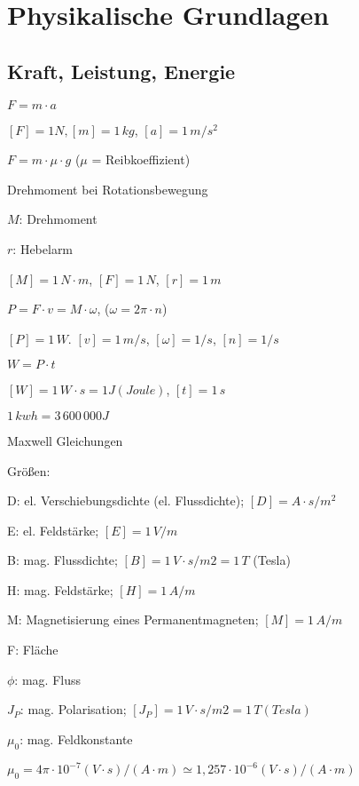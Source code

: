\documentclass[german]{latex4ei/latex4ei_sheet}
\begin{document}
	\section{Physikalische Grundlagen}
	\begin{sectionbox}
		\subsection{Kraft, Leistung, Energie}
			$F= m \cdot a$

			$[F] = 1N,[m]= 1\,kg$, $[a]= 1\,m/s^2$

			$F= m \cdot \mu \cdot g$ ($\mu$ = Reibkoeffizient)

			\begin{symbolbox}{Drehmoment bei Rotationsbewegung}
				\item $M$: Drehmoment
				\item $r$: Hebelarm
				\item $[M] = 1\,N \cdot m$, $[F]= 1\,N$, $[r]=1\,m$
				\item $P = F\cdot v = M\cdot \omega$, ($\omega = 2\pi\cdot n$)
				\item $[P]= 1\,W$. $[v]= 1\,m/s$, $[\omega]=1/s$, $[n]=1/s$ 
				\item $W= P\cdot t$
				\item $[W]= 1\,W\cdot s = 1J(Joule)$, $[t] = 1\,s$
				\item $1\,kwh = 3\,600\,000 J$
			\end{symbolbox}
			\begin{bluebox}{Maxwell Gleichungen}
				\item Größen:
				\item D: el. Verschiebungsdichte (el. Flussdichte); $[D] = A \cdot s/m^2$
				\item E: el. Feldstärke; $[E ] = 1\,V/m$
				\item B: mag. Flussdichte; $[B] = 1\,V\cdot s/m2 = 1\,T$ (Tesla)
				\item H: mag. Feldstärke; $[H] = 1\,A/m$
				\item M: Magnetisierung eines Permanentmagneten; $[M] = 1\,A/m$
				\item F: Fläche
				\item $\phi$: mag. Fluss
				\item $J_P$: mag. Polarisation; $[J_P] = 1\,V \cdot s/m2 = 1\,T (Tesla)$
				\item $\mu_0$: mag. Feldkonstante
				\item $μ_0 =  4\pi \cdot 10^{-7}(V\cdot s)/(A\cdot m)\simeq 1,257\cdot 10^{-6}(V\cdot s)/(A\cdot m)$

\end{bluebox}
\end{sectionbox}
\end{document}
